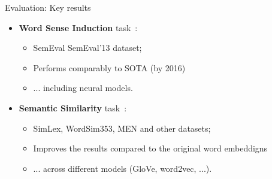 \begin{frame}{Evaluation: Key results}

\begin{itemize}
	\item \alert{\textbf{Word Sense Induction}} task~\cite{pelevina-EtAl:2016:RepL4NLP}:
	\begin{itemize}
	\item SemEval  SemEval'13 dataset;
	\item Performs comparably to SOTA (by 2016)
	\item ... including neural models. 
	\end{itemize}
	
	\pause
	\item \alert{\textbf{Semantic Similarity}} task~\cite{remus:2018}:
	\begin{itemize}
	\item SimLex, WordSim353, MEN and other datasets;
	\item Improves the results compared to the original word embeddigns
	\item ... across different models (GloVe, word2vec, ...). 
	\end{itemize}
\end{itemize}
	
\end{frame}

